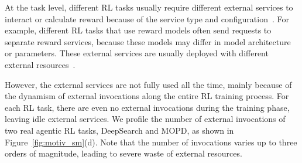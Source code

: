 
At the task level, different RL tasks usually require different external services to interact or calculate reward because of the service type and configuration~\citep{li2025cuda,jin2025search,xiao2026mimo}.
For example, different RL tasks that use reward models often send requests to separate reward services, because these models may differ in model architecture or parameters. 
These external services are usually deployed with different external resources~\citep{micromulti,jiang2025verltool}.

However, the external services are not fully used all the time, mainly because of the dynamism of external invocations along the entire RL training process.
For each RL task, there are even no external invocations during the training phase, leaving idle external services.
We profile the number of external invocations of two real agentic RL tasks, DeepSearch and MOPD, as shown in Figure~\ref{fig:motiv_sm}(d).
Note that the number of invocations varies up to three orders of magnitude, leading to severe waste of external resources.


